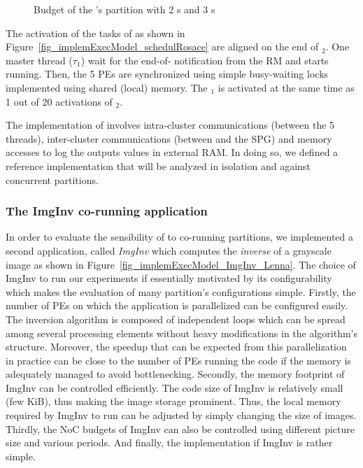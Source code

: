 \documentclass[main.tex]{subfiles}
\begin{document}
\begin{description}
            \begin{figure}
                \centering
                \scalebox{0.7}{}
                \caption{Budget of the \rosace's partition with 2 \PN{}s and 3 \PC{}s}
                \label{fig_implemExecModel_rosacePartBudget}
            \end{figure}
            
            The activation of the tasks of \rosace as shown in Figure~\ref{fig_implemExecModel_schedulRosace} are aligned on the end of \PC{}$_2$. One master thread ($\tau_1$) wait for the end-of-\PC{} notification from the RM and starts running. Then, the 5 PEs are synchronized using simple busy-waiting locks implemented using shared (local) memory. The \PC{}$_1$ is activated at the same time as 1 out of 20 activations of \PC{}$_2$.
\end{description}

The implementation of \rosace involves intra-cluster communications (between the 5 threads), inter-cluster communications (between \rosace and the SPG) and memory accesses to log the outputs values in external RAM. In doing so, we defined a reference implementation that will be analyzed in isolation and against concurrent partitions.

\subsubsection{The ImgInv co-running application}
In order to evaluate the sensibility of \rosace to co-running partitions, we implemented a second application, called \emph{ImgInv} which computes the \emph{inverse} of a grayscale image as shown in Figure~\ref{fig_implemExecModel_ImgInv_Lenna}. The choice of ImgInv to run our experiments if essentially motivated by its configurability which makes the evaluation of many partition's configurations simple. Firstly, the number of PEs on which the application is parallelized can be configured easily. The inversion algorithm is composed of independent loops which can be spread among several processing elements without heavy modifications in the algorithm's structure. Moreover, the speedup that can be expected from this parallelization in practice can be close to the number of PEs running the code if the memory is adequately managed to avoid bottlenecking. Secondly, the memory footprint of ImgInv can be controlled efficiently. The code size of ImgInv is relatively small (few KiB), thus making the image storage prominent. Thus, the local memory required by ImgInv to run can be adjusted by simply changing the size of images. Thirdly, the NoC budgets of ImgInv can also be controlled using different picture size and various periods. And finally, the implementation if ImgInv is rather simple. 
\end{document}
